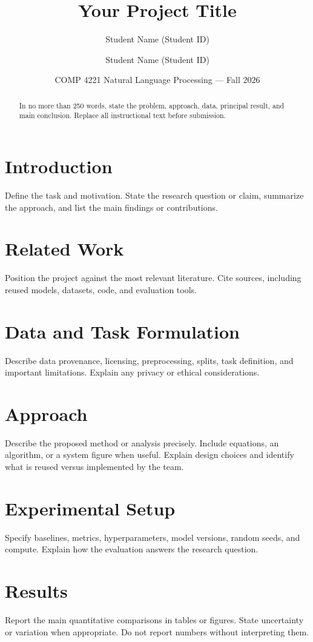 \documentclass[10pt]{article}
\title{\vspace{-1.5em}\textbf{Your Project Title}}
\author{Student Name (Student ID) \and Student Name (Student ID)}
\date{COMP 4221 Natural Language Processing --- Fall 2026}
\begin{document}
\maketitle

\begin{abstract}
In no more than 250 words, state the problem, approach, data, principal result, and main conclusion. Replace all instructional text before submission.
\end{abstract}

\section{Introduction}
Define the task and motivation. State the research question or claim, summarize the approach, and list the main findings or contributions.

\section{Related Work}
Position the project against the most relevant literature. Cite sources, including reused models, datasets, code, and evaluation tools.

\section{Data and Task Formulation}
Describe data provenance, licensing, preprocessing, splits, task definition, and important limitations. Explain any privacy or ethical considerations.

\section{Approach}
Describe the proposed method or analysis precisely. Include equations, an algorithm, or a system figure when useful. Explain design choices and identify what is reused versus implemented by the team.

\section{Experimental Setup}
Specify baselines, metrics, hyperparameters, model versions, random seeds, and compute. Explain how the evaluation answers the research question.

\section{Results}
Report the main quantitative comparisons in tables or figures. State uncertainty or variation when appropriate. Do not report numbers without interpreting them.
\end{document}
